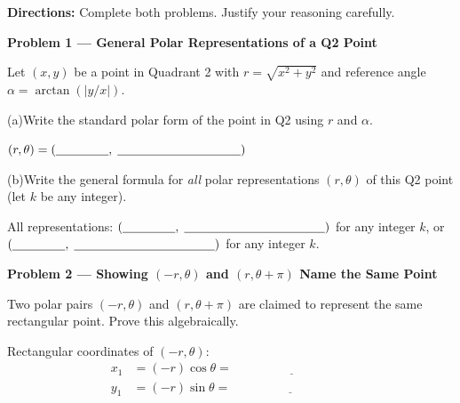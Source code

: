 \documentclass[10pt]{article}
\begin{document}
\begin{tcolorbox}[colback=white, colframe=black!40,
    title=\textbf{Tier E --- Extend},
    fonttitle=\bfseries, arc=2mm, left=3mm, right=3mm, top=2mm, bottom=2mm]

\textbf{Directions:} Complete both problems. Justify your reasoning carefully.

\vspace{6pt}
\textbf{Problem 1 --- General Polar Representations of a Q2 Point}

Let $(x,y)$ be a point in Quadrant 2 with $r = \sqrt{x^2+y^2}$ and
reference angle $\alpha = \arctan(|y/x|)$.

\vspace{4pt}
(a)\quad Write the standard polar form of the point in Q2 using $r$ and $\alpha$.

\vspace{4pt}
$(r,\theta) = (\underline{\hspace{1.5cm}},\; \underline{\hspace{3.5cm}})$

\vspace{6pt}
(b)\quad Write the general formula for \emph{all} polar representations
$(r,\theta)$ of this Q2 point (let $k$ be any integer).

\vspace{4pt}
All representations: $(\underline{\hspace{1.5cm}},\; \underline{\hspace{4cm}})$ for any integer $k$,
or $(\underline{\hspace{1.5cm}},\; \underline{\hspace{4cm}})$ for any integer $k$.

\vspace{8pt}
\textbf{Problem 2 --- Showing $(-r,\theta)$ and $(r,\theta+\pi)$ Name the Same Point}

Two polar pairs $(-r,\theta)$ and $(r,\theta+\pi)$ are claimed to represent the
same rectangular point. Prove this algebraically.

\vspace{4pt}
Rectangular coordinates of $(-r,\theta)$:
\begin{align*}
x_1 &= (-r)\cos\theta = \underline{\hspace{4cm}} \\
y_1 &= (-r)\sin\theta = \underline{\hspace{4cm}}
\end{align*}


\end{tcolorbox}
\end{document}
